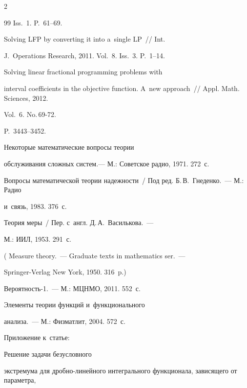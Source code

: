 \begin{multicols}{2}
{{\begin{thebibliography}{99}
Iss.~1. P.~61--69.


   Solving LFP by converting it into a~single LP~// Int. 

J.~Operations Research, 2011. Vol.~8. Iss.~3. P.~1--14.




   Solving linear fractional programming problems with 

interval coefficients in the objective function. A~new approach~// Appl. Math. Sciences, 2012. 

Vol.~6. No.\,69-72.  

P.~3443--3452.




   Некоторые математические вопросы теории 

обслуживания сложных систем.--- М.: Советское радио, 1971. 272~с.


  Вопросы математической теории надежности~/ Под ред. Б.\,В.~Гнеденко.~--- М.: Радио 

и~связь, 1983. 376~с.


   Теория меры~/ Пер. с~англ. Д.\,А.~Василькова.~--- 

  М.: ИИЛ, 1953. 291~с.

  ( {Measure theory}.~--- Graduate texts in mathematics ser.~---

Springer-Verlag New York, 1950. 316~p.)


   Вероятность-1.~--- М.: МЦНМО, 2011. 552~с.


   Элементы теории функций и~функционального 

анализа.~--- М.: Физматлит, 2004. 572~с.


   Приложение к~\mbox{статье}: 

  Решение задачи безусловного 

экстремума для дроб\-но-ли\-ней\-но\-го интегрального функционала, зависящего от параметра, 


\end{thebibliography}}}
\end{multicols}
